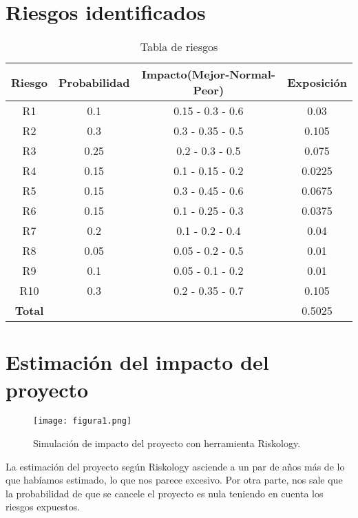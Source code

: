 \section{Riesgos identificados}
\begin{table}[H]
	\begin{center}
		\begin{tabular}{|c||c|c|c|}
			\hline 
			Riesgo & Probabilidad & Impacto(Mejor-Normal-Peor) & Exposición  \\
			\hline \hline
			R1 & 0.1 & 0.15 - 0.3 - 0.6 & 0.03 \\ \hline
			R2 & 0.3 & 0.3 - 0.35 - 0.5 & 0.105 \\ \hline
			R3 & 0.25 & 0.2 - 0.3 - 0.5 & 0.075 \\ \hline
			R4 & 0.15 & 0.1 - 0.15 - 0.2 & 0.0225 \\ \hline
			R5 & 0.15 & 0.3 - 0.45 - 0.6 & 0.0675 \\ \hline
			R6 & 0.15 & 0.1 - 0.25 - 0.3 & 0.0375 \\ \hline
			R7 & 0.2 & 0.1 - 0.2 - 0.4 & 0.04 \\ \hline
			R8 & 0.05 & 0.05 - 0.2 - 0.5 & 0.01 \\ \hline
			R9 & 0.1 & 0.05 - 0.1 - 0.2  & 0.01 \\ \hline
			R10 & 0.3 & 0.2 - 0.35 - 0.7 & 0.105 \\ \hline \hline
			\textbf{Total} & & & 0.5025 \\ \hline
		\end{tabular}
		\caption{Tabla de riesgos}
		\label{tabla:riesgos}
	\end{center}
\end{table}

\section{Estimación del impacto del proyecto}

\begin{figure}[h]
	\centering 		
	\texttt{[image: figura1.png]}
	\caption{Simulación de impacto del proyecto con herramienta Riskology.}
	\label{fig:riskology} 
\end{figure}

La estimación del proyecto según Riskology asciende a un par de años más de lo que habíamos estimado, lo que nos parece excesivo. Por otra parte, nos sale que la probabilidad de que se cancele el proyecto es nula teniendo en cuenta los riesgos expuestos.

